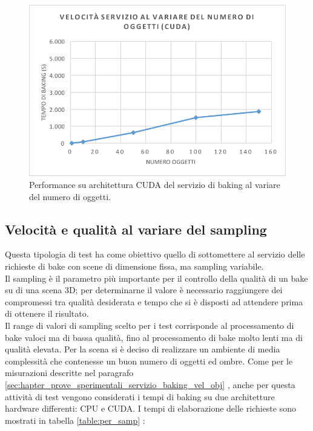 \begin{figure}[htb]
 \centering
 \includegraphics[width=0.8\linewidth]{images/chapter_prove_sperimentali/grafico2.png}\hfill
 \caption[Performance CUDA variando oggetti]{Performance su architettura CUDA del servizio di baking al variare del numero di oggetti.}
 \label{fig:grafico2}
\end{figure}

\subsection{Velocità e qualità al variare del sampling}
\label{sec:chapter_prove_sperimentali_servizio_baking_vel_sam}

Questa tipologia di test ha come obiettivo quello di sottomettere al servizio delle richieste di bake con scene di dimensione fissa, ma sampling variabile. 
\\
Il sampling è il parametro più importante per il controllo della qualità di un bake su di una scena 3D; per determinarne il valore è necessario raggiungere dei compromessi tra qualità desiderata e tempo che si è disposti ad attendere prima di ottenere il risultato. 
\\
Il range di valori di sampling scelto per i test corrisponde al processamento di  bake valoci ma di bassa qualità, fino al processamento di bake molto lenti ma di qualità elevata. Per la scena si è deciso di realizzare un ambiente di media complessità che contenesse un buon numero di oggetti ed ombre. Come per le misurazioni descritte nel paragrafo \ref{sec:hapter_prove_sperimentali_servizio_baking_vel_obj} , anche per questa attività di test vengono considerati i tempi di baking su due architetture hardware differenti: CPU e CUDA.
I tempi di elaborazione delle richieste sono mostrati in tabella \ref{table:per_samp} :


